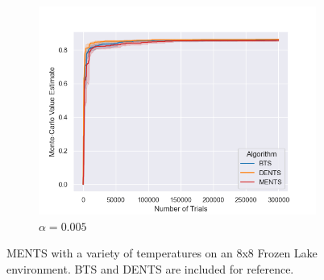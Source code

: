 \begin{figure}
\begin{subfigure}[b]{0.32\textwidth}
                    \centering
                    \includegraphics[width=\textwidth]{figures/temp/fl_sens/058_fl8_0_005_01.png}
                    \caption{$\alpha=0.005$}
                \end{subfigure}
                
                \caption{MENTS with a variety of temperatures on an 8x8 Frozen Lake environment. BTS and DENTS are included for reference. }
                \label{fig:fl_param_sens_ments}
            \end{figure}
            
